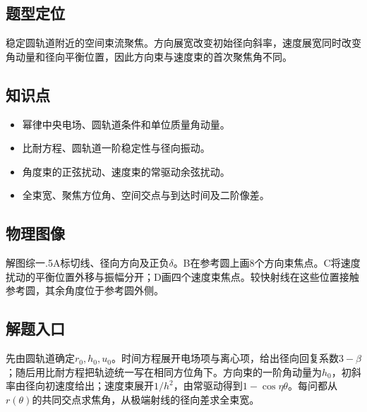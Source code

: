 \documentclass[UTF8,fontset=fandol,a4paper,11pt]{ctexart}
\begin{document}


\subsection*{题型定位}

稳定圆轨道附近的空间束流聚焦。方向展宽改变初始径向斜率，速度展宽同时改变角动量和径向平衡位置，因此方向束与速度束的首次聚焦角不同。



\subsection*{知识点}

\begin{itemize}
\item 幂律中央电场、圆轨道条件和单位质量角动量。
\item 比耐方程、圆轨道一阶稳定性与径向振动。
\item 角度束的正弦扰动、速度束的常驱动余弦扰动。
\item 全束宽、聚焦方位角、空间交点与到达时间及二阶像差。
\end{itemize}



\subsection*{物理图像}

解图综一.5A标切线、径向方向及正负$\delta$。B在参考圆上画8个方向束焦点。C将速度扰动的平衡位置外移与振幅分开；D画四个速度束焦点。较快射线在这些位置接触参考圆，其余角度位于参考圆外侧。



\subsection*{解题入口}

先由圆轨道确定$r_0,h_0,u_0$。时间方程展开电场项与离心项，给出径向回复系数$3-\beta$；随后用比耐方程把轨迹统一写在相同方位角下。方向束的一阶角动量为$h_0$，初斜率由径向初速度给出；速度束展开$1/h^2$，由常驱动得到$1-\cos\eta\theta$。每问都从$r(\theta)$的共同交点求焦角，从极端射线的径向差求全束宽。
\end{document}
